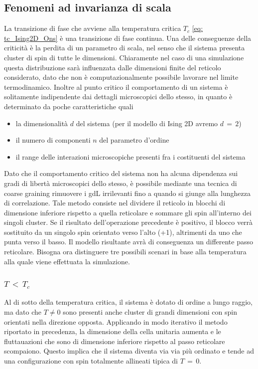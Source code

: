\subsection{Fenomeni ad invarianza di scala}

La transizione di fase che avviene alla temperatura critica $T_c$ \eqref{eq: tc_Ising2D_Ons} è una transizione di fase continua. Una delle 
conseguenze della criticità è la perdita di un parametro di scala, nel senso che il sistema presenta cluster di spin di tutte le dimensioni. 
Chiaramente nel caso di una simulazione questa distribuzione sarà influenzata dalle dimensioni finite del reticolo considerato, dato che 
non è computazionalmente possibile lavorare nel limite termodinamico. Inoltre al punto critico il comportamento di un sistema è 
solitamente indipendente dai dettagli microscopici dello stesso, in quanto è determinato da poche caratteristiche quali

\begin{itemize}[label=$\diamond$] 
    \item la dimensionalità $d$ del sistema (per il modello di Ising 2D avremo $d\,=\,2$)
    \item il numero di componenti $n$ del parametro d'ordine
    \item il range delle interazioni microscopiche presenti fra i costituenti del sistema
\end{itemize}

Dato che il comportamento critico del sistema non ha alcuna dipendenza sui gradi di libertà microscopici dello stesso, è possibile mediante 
una tecnica di coarse graining rimuovere i gdL irrilevanti fino a quando si giunge alla lunghezza di correlazione. Tale metodo consiste 
nel dividere il reticolo in blocchi di dimensione inferiore rispetto a quella reticolare e sommare gli spin all'interno dei singoli cluster. 
Se il risultato dell'operazione precedente è positivo, il blocco verrà sostituito da un singolo spin orientato verso l'alto (+1), 
altrimenti da uno che punta verso il basso. Il modello risultante avrà di conseguenza un differente passo reticolare. Bisogna ora  
distinguere tre possibili scenari in base alla temperatura alla quale viene effettuata la simulazione.



\subsubsection{$T\,<\,T_c$}

Al di sotto della temperatura critica, il sistema è dotato di ordine a lungo raggio, ma dato che $T \neq 0$ sono presenti anche cluster 
di grandi dimensioni con spin orientati nella direzione opposta. Applicando in modo iterativo il metodo riportato in precedenza, la 
dimensione della cella unitaria aumenta e le fluttauazioni che sono di dimensione inferiore rispetto al passo reticolare scompaiono. 
Questo implica che il sistema diventa via via più ordinato e tende ad una configurazione con spin totalmente allineati tipica di 
$T\,=\,0$.



